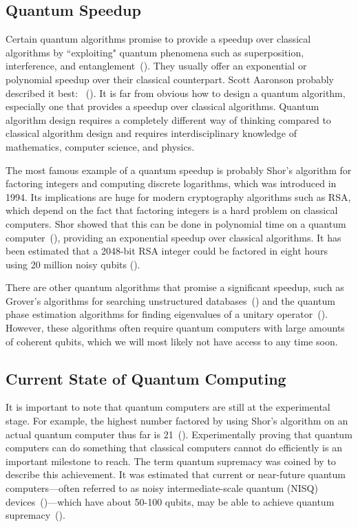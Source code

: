 \documentclass[a4paper,10pt]{article}
\begin{document}
\subsection{Quantum Speedup}
Certain quantum algorithms promise to provide a speedup over classical algorithms by ``exploiting" quantum phenomena such as superposition, interference, and entanglement~(\cite{nielsen-chuang}).
They usually offer an exponential or polynomial speedup over their classical counterpart.
Scott Aaronson probably described it best:
~(\cite{scott-aaronson-qc}).
It is far from obvious how to design a quantum algorithm, especially one that provides a speedup over classical algorithms.
Quantum algorithm design requires a completely different way of thinking compared to classical algorithm design and requires interdisciplinary knowledge of mathematics, computer science, and physics.

The most famous example of a quantum speedup is probably Shor's algorithm for factoring integers and computing discrete logarithms, which was introduced in 1994.
Its implications are huge for modern cryptography algorithms such as RSA, which depend on the fact that factoring integers is a hard problem on classical computers.
Shor showed that this can be done in polynomial time on a quantum computer~(\cite{shor-factoring}), providing an exponential speedup over classical algorithms. 
It has been estimated that a 2048-bit RSA integer could be factored in eight hours using 20 million noisy qubits (\cite{shor-20mil}).

There are other quantum algorithms that promise a significant speedup, such as Grover's algorithms for searching unstructured databases~(\cite{grover-search}) and the quantum phase estimation algorithms for finding eigenvalues of a unitary operator~(\cite{nielsen-chuang}).
However, these algorithms often require quantum computers with large amounts of coherent qubits, which we will most likely not have access to any time soon.

\subsection{Current State of Quantum Computing}
It is important to note that quantum computers are still at the experimental stage.
For example, the highest number factored by using Shor's algorithm on an actual quantum computer thus far is 21~(\cite{shor-21}).
Experimentally proving that quantum computers can do something that classical computers cannot do efficiently is an important milestone to reach.
The term quantum supremacy was coined by \textcite{preskill-qc} to describe this achievement.
It was estimated that current or near-future quantum computers---often referred to as noisy intermediate-scale quantum (NISQ) devices~(\cite{preskill-nisq})---which have about 50-100 qubits, may be able to achieve quantum supremacy~(\cite{boixo2018characterizing}).
\end{document}
